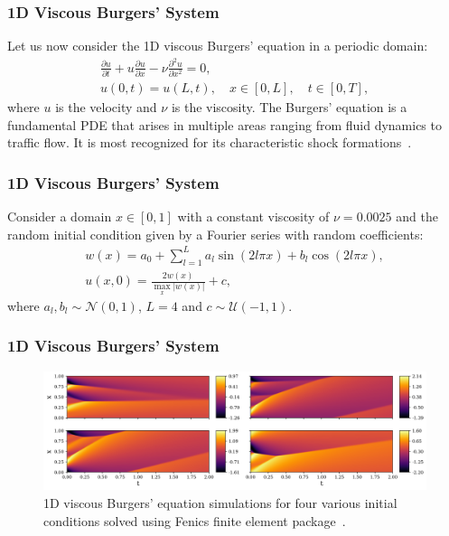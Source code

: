 \documentclass{beamer}
\theoremstyle{remark}
\newcommand{\viscosity}{\nu}
\newcommand{\mc}{\mathcal}
\begin{document}
\begin{frame}
\frametitle{1D Viscous Burgers' System}
Let us now consider the 1D viscous Burgers' equation in a periodic domain:
\begin{gather}
    \frac{\partial u}{\partial t} + u\frac{\partial u}{\partial x} - \viscosity \frac{\partial^{2} u}{\partial x^{2}} = 0,\\
     u(0,t) = u(L,t), \quad x\in[0,L], \quad t\in[0,T],
\end{gather}
where $u$ is the velocity and $\viscosity$ is the viscosity.
The Burgers' equation is a fundamental PDE that arises in multiple areas ranging from fluid dynamics to traffic flow. It is most recognized for its characteristic shock formations~\cite{whitham2011linear}.
\end{frame}

\begin{frame}
\frametitle{1D Viscous Burgers' System}
Consider a domain $x\in[0,1]$ with a constant viscosity of $\viscosity = 0.0025$ and the random initial condition given by a Fourier series with random coefficients:
\begin{equation}
    \begin{gathered}
    w(x) = a_0 + \sum_{l=1}^L a_l \sin(2l\pi x) + b_l \cos(2l\pi x), \\
    u(x,0) = \frac{2w(x)}{\max_x |w(x)|} + c,
    \label{eq:burger1d-initial}
    \end{gathered}
\end{equation}
where $a_l, b_l \sim \mc N(0, 1)$, $L=4$ and $c\sim \mc U(-1, 1)$.
\end{frame}

\begin{frame}
\frametitle{1D Viscous Burgers' System}
\begin{figure}[H]
    \centering
    \includegraphics[width=\textwidth]{Fig09.png}
    \caption{1D viscous Burgers' equation simulations for four various initial conditions solved using Fenics finite element package~\cite{alnaes2015fenics}.}
    \label{fig:burgers1D-FEM}
\end{figure}
\end{frame}
\end{document}

